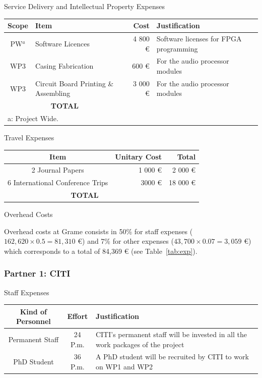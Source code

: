 \documentclass[a4paper,9pt]{extarticle}
\newcommand{\secfont}{\noindent\color{ANRblue}\normalfont\sffamily}
\begin{document}
{\secfont Service Delivery and Intellectual Property Expenses}

\noindent
\begin{center}
\begin{tabular}{c | p{3cm} | r | p{10cm}}
\textbf{Scope} & \textbf{Item} & \textbf{Cost} & \textbf{Justification}\\
\hline
\hline
PW$^a$ & Software Licences & 4 800 \euro{} & Software licenses for FPGA programming\\
\hline
WP3 & Casing Fabrication & 600 \euro{} & For the audio processor modules\\
\hline
WP3 & Circuit Board Printing \& Assembling & 3 000 \euro{} & For the audio processor modules\\
\hline
\hline
\multicolumn{2}{c}{\textbf{TOTAL}} 8 400 \euro{} \\
\hline
\multicolumn{4}{l}{a: Project Wide.}
\end{tabular}
\end{center}

{\secfont Travel Expenses}

\begin{center}
\begin{tabular}{c | r | r}
\textbf{Item} & \textbf{Unitary Cost} & \textbf{Total} \\
\hline
\hline
2 Journal Papers & 1 000 \euro{} & 2 000 \euro{}\\
\hline
6 International Conference Trips & 3000 \euro{} & 18 000 \euro{}\\
\hline
\hline
\multicolumn{2}{c}{\textbf{TOTAL}} 20 000 \euro{} \\
\hline
\end{tabular}
\end{center}

{\secfont Overhead Costs}

\noindent
Overhead costs at Grame consists in 50\% for staff expenses ($162,620\times0.5 = 81,310$ \euro{}) and 7\% for other expenses ($43,700\times0.07 = 3,059$ \euro{}) which corresponds to a total of 84,369 \euro{} (see Table~\ref{tab:exp}).

\subsubsection{Partner 1: CITI}

{\secfont Staff Expenses}

\noindent
\begin{center}
\begin{tabular}{c | c | p{10cm}}
\textbf{Kind of Personnel} & \textbf{Effort} & \textbf{Justification}\\
\hline
\hline
Permanent Staff & 24 P.m. & CITI's permanent staff will be invested in all the work packages of the project\\
PhD Student & 36 P.m. & A PhD student will be recruited by CITI to work on WP1 and WP2
\end{tabular}
\end{center}
\end{document}
